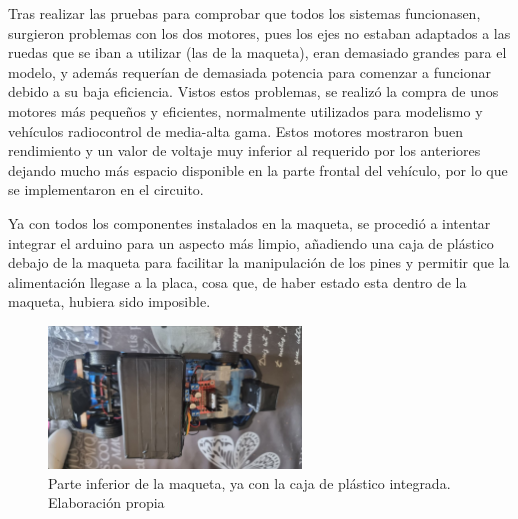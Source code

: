 Tras realizar las pruebas para comprobar que todos los sistemas funcionasen, surgieron problemas con los dos motores, pues los ejes no estaban adaptados a las ruedas que se iban a utilizar (las de la maqueta), eran demasiado grandes para el modelo, y además requerían de demasiada potencia para comenzar a funcionar debido a su baja eficiencia. Vistos estos problemas, se realizó la compra de unos motores más pequeños y eficientes, normalmente utilizados para modelismo y vehículos radiocontrol de media-alta gama. Estos motores mostraron buen rendimiento y un valor de voltaje muy inferior al requerido por los anteriores dejando mucho más espacio disponible en la parte frontal del vehículo, por lo que se implementaron en el circuito. 



Ya con todos los componentes instalados en la maqueta, se procedió a intentar integrar el arduino para un aspecto más limpio, añadiendo una caja de plástico debajo de la maqueta para facilitar la manipulación de los pines y permitir que la alimentación llegase a la placa, cosa que, de haber estado esta dentro de la maqueta, hubiera sido imposible. 

\begin{figure}[H]
    \centering
    \includegraphics[width=0.6\textwidth]{imagenes/montaje/ensamblado.jpg}
    \caption{Parte inferior de la maqueta, ya con la caja de plástico integrada. Elaboración propia}
\end{figure}

